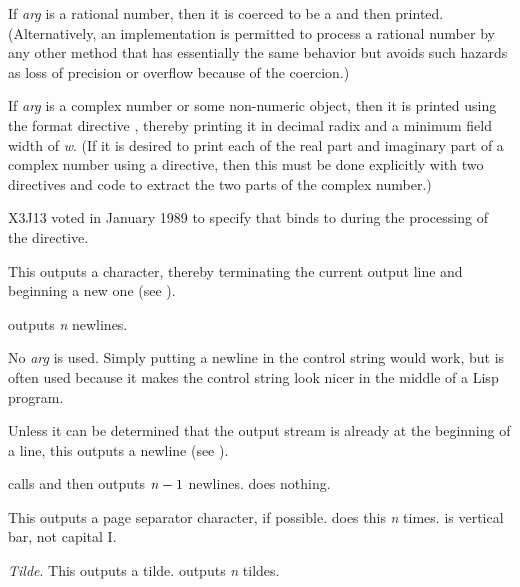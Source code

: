 \begin{flushdesc}
If {\it arg} is a rational number, then it is coerced to be a 
and then printed.  (Alternatively, an implementation is permitted to
process a rational number by any other method that has essentially the
same behavior but avoids such hazards as loss of precision or overflow
because of the coercion.)

If {\it arg} is a complex number or some non-numeric
object, then it is printed using the format directive ,
thereby printing it in decimal radix and a minimum field width of {\it w}.
(If it is desired to print each of the real part and imaginary part
of a complex number using a \cd{{\Xtilde}\$} directive, then this must
be done explicitly with two \cd{{\Xtilde}\$} directives and code to
extract the two parts of the complex number.)

\begin{new}
X3J13 voted in January 1989
to specify that  binds  to 
during the processing of the \cd{{\Xtilde}\$} directive.
\end{new}


\item[\cd{{\Xtilde}\%}]
This outputs a  character, thereby terminating the current
output line and beginning a new one
(see ).

 outputs {\it n} newlines.

No {\it arg} is used.  Simply putting a newline in the control string
would work, but \cd{{\Xtilde}\%} is often used because it makes the control string
look nicer in the middle of a Lisp program.

\item[\cd{{\Xtilde}\&}]
Unless it can be determined that the output stream
is already at the beginning of a line,
this outputs a newline (see ).

 calls 
and then outputs ${\it n}-1$ newlines.
 does nothing.

\item[\cd{{\Xtilde}|}]
This outputs a page separator character, if possible.
 does this
{\it n} times.  \cd{|} is vertical bar, not capital I.

\item[\cd{{\Xtilde}{\Xtilde}}]
{\it Tilde}.
This outputs a tilde.   outputs {\it n} tildes.


\end{flushdesc}
